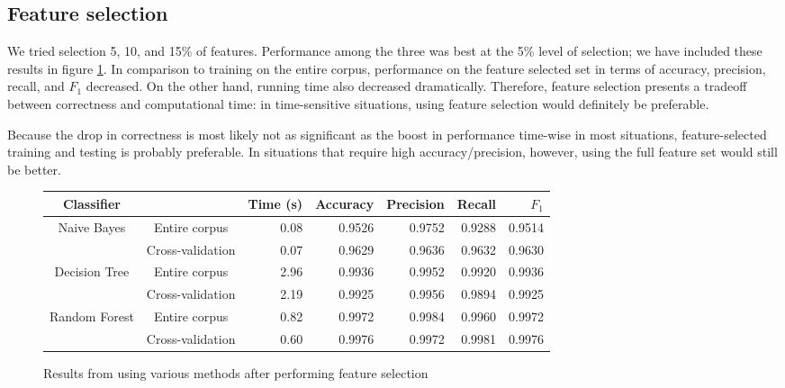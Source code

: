 \documentclass{article} %
\begin{document}
\subsection{Feature selection}
We tried selection 5, 10, and 15\% of features. Performance among the three was best at the 5\% level of selection; we have included these results in figure \ref{fig:table_selected}. In comparison to training on the entire corpus, performance on the feature selected set in terms of accuracy, precision, recall, and $F_1$ decreased. On the other hand, running time also decreased dramatically. Therefore, feature selection presents a tradeoff between correctness and computational time: in time-sensitive situations, using feature selection would definitely be preferable. 

Because the drop in correctness is most likely not as significant as the boost in performance time-wise in most situations, feature-selected training and testing is probably preferable. In situations that require high accuracy/precision, however, using the full feature set would still be better. 

\begin{figure}[h]
  \begin{tabular}[h]{ | c | c | r | r | r | r | r | }
    \hline
    Classifier    &                  & Time (s) & Accuracy & Precision & Recall & $F_1$  \\ \hline
    Naive Bayes   & Entire corpus    & 0.08     & 0.9526   & 0.9752    & 0.9288 & 0.9514 \\ \cline{2-7}
                  & Cross-validation & 0.07     & 0.9629   & 0.9636    & 0.9632 & 0.9630 \\ \hline
    Decision Tree & Entire corpus    & 2.96     & 0.9936   & 0.9952    & 0.9920 & 0.9936 \\ \cline{2-7}
                  & Cross-validation & 2.19     & 0.9925   & 0.9956    & 0.9894 & 0.9925 \\ \hline
    Random Forest & Entire corpus    & 0.82     & 0.9972   & 0.9984    & 0.9960 & 0.9972 \\ \cline{2-7}
                  & Cross-validation & 0.60     & 0.9976   & 0.9972    & 0.9981 & 0.9976 \\ \hline
  \end{tabular}
  \caption{Results from using various methods after performing feature selection}
  \label{fig:table_selected}
\end{figure}

\end{document}
